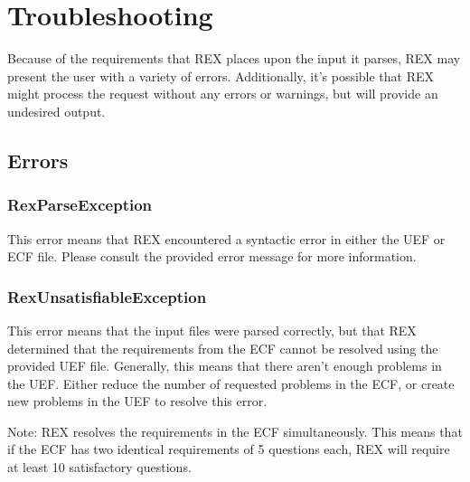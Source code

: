 \documentclass{article}
\begin{document}
\section{Troubleshooting}
Because of the requirements that REX places upon the input it parses, REX may present the user with a variety of errors. Additionally, it's possible that REX might process the request without any errors or warnings, but will provide an undesired output.

\subsection{Errors}
\subsubsection{RexParseException}
This error means that REX encountered a syntactic error in either the UEF or ECF file. Please consult the provided error message for more information.

\subsubsection{RexUnsatisfiableException}
\label{RexUnsatisfiableException}
This error means that the input files were parsed correctly, but that
REX determined that the requirements from the ECF cannot be resolved
using the provided UEF file. Generally, this means that there aren't
enough problems in the UEF. Either reduce the number of requested
problems in the ECF, or create new problems in the UEF to resolve
this error.

Note: REX resolves the requirements in the ECF simultaneously. This means
that if the ECF has two identical requirements of 5 questions each, REX
will require at least 10 satisfactory questions.



\end{document}

